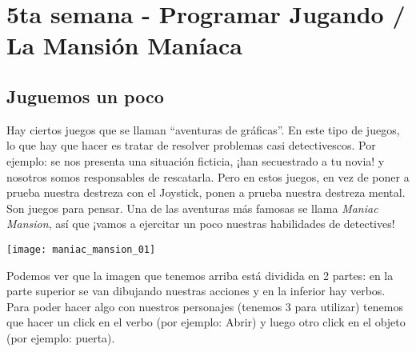 \chapter{5ta semana - Programar Jugando / La Mansión Maníaca}

\section{Juguemos un poco}
Hay ciertos juegos que se llaman “aventuras de gráficas”. En este tipo de juegos, lo que hay que hacer es tratar de resolver problemas casi detectivescos. Por ejemplo: se nos presenta una situación ficticia, ¡han secuestrado a tu novia! y nosotros somos responsables de rescatarla. Pero en estos juegos, en vez de poner a prueba nuestra destreza con el Joystick, ponen a prueba nuestra destreza mental. Son juegos para pensar. Una de las aventuras más famosas se llama \emph{Maniac Mansion}, así que ¡vamos a ejercitar un poco nuestras habilidades de detectives!

\begin{center}
  \texttt{[image: maniac\_mansion\_01]}
\end{center}

Podemos ver que la imagen que tenemos arriba está dividida en 2 partes: en la parte superior se van dibujando nuestras acciones y en la inferior hay verbos. Para poder hacer algo con nuestros personajes (tenemos 3 para utilizar) tenemos que hacer un click en el verbo (por ejemplo: Abrir) y luego otro click en el objeto (por ejemplo: puerta).\\

